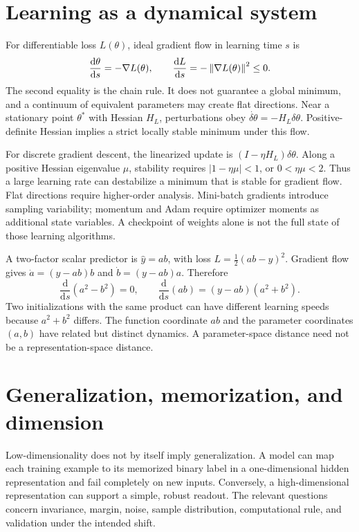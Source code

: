 \section{Learning as a dynamical system}
For differentiable loss $L(\theta)$, ideal gradient flow in learning time $s$ is
\begin{equation}
 \frac{\mathrm d\theta}{\mathrm ds}=-\nabla L(\theta),
 \qquad \frac{\mathrm dL}{\mathrm ds}=-\left\lVert \nabla L(\theta)\right\rVert^2\leq0.
 \label{eq:10-gradflow}
\end{equation}
The second equality is the chain rule. It does not guarantee a global minimum, and a continuum of equivalent parameters may create flat directions. Near a stationary point $\theta^*$ with Hessian $H_L$, perturbations obey $\dot{\delta\theta}=-H_L\delta\theta$. Positive-definite Hessian implies a strict locally stable minimum under this flow.

For discrete gradient descent, the linearized update is $(I-\eta H_L)\delta\theta$. Along a positive Hessian eigenvalue $\mu$, stability requires $|1-\eta\mu|<1$, or $0<\eta\mu<2$. Thus a large learning rate can destabilize a minimum that is stable for gradient flow. Flat directions require higher-order analysis. Mini-batch gradients introduce sampling variability; momentum and Adam require optimizer moments as additional state variables. A checkpoint of weights alone is not the full state of those learning algorithms.

\begin{example}
A two-factor scalar predictor is $\hat y=ab$, with loss $L=\tfrac12(ab-y)^2$. Gradient flow gives $\dot a=(y-ab)b$ and $\dot b=(y-ab)a$. Therefore
\[
 \frac{\mathrm d}{\mathrm ds}(a^2-b^2)=0,\qquad
 \frac{\mathrm d}{\mathrm ds}(ab)=(y-ab)(a^2+b^2).
\]
Two initializations with the same product can have different learning speeds because $a^2+b^2$ differs. The function coordinate $ab$ and the parameter coordinates $(a,b)$ have related but distinct dynamics. A parameter-space distance need not be a representation-space distance.
\end{example}

\section{Generalization, memorization, and dimension}
Low-dimensionality does not by itself imply generalization. A model can map each training example to its memorized binary label in a one-dimensional hidden representation and fail completely on new inputs. Conversely, a high-dimensional representation can support a simple, robust readout. The relevant questions concern invariance, margin, noise, sample distribution, computational rule, and validation under the intended shift.

